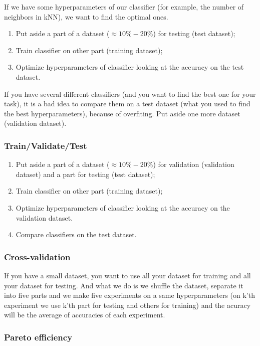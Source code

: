 If we have some hyperparameters of our classifier (for example, the number of neighbors in kNN), we want to find the optimal ones.
\begin{enumerate}
	\item Put aside a part of a dataset ($\approx 10\%-20\%$) for testing (test dataset);
	\item Train classifier on other part (training dataset);
	\item Optimize hyperparameters of classifier looking at the accuracy on the test dataset.
\end{enumerate}
If you have several different classifiers (and you want to find the best one for your task), it is a bad idea to compare them on a test dataset (what you used to find the best hyperparameters), because of overfiting. Put aside one more dataset (validation dataset).

\subsubsection*{Train/Validate/Test}

\begin{enumerate}
	\item Put aside a part of a dataset ($\approx 10\%-20\%$) for validation (validation dataset) and a part for testing (test dataset);
	\item Train classifier on other part (training dataset);
	\item Optimize hyperparameters of classifier looking at the accuracy on the validation dataset.
	\item Compare classifiers on the test dataset.
\end{enumerate}

\subsubsection*{Cross-validation}

If you have a small dataset, you want to use all your dataset for training and all your dataset for testing. And what we do is we shuffle the dataset, separate it into five parts and we make five experiments on a same hyperparameters (on k'th experiment we use k'th part for testing and others for training) and the acuracy will be the average of accuracies of each experiment.

\subsubsection*{Pareto efficiency}

